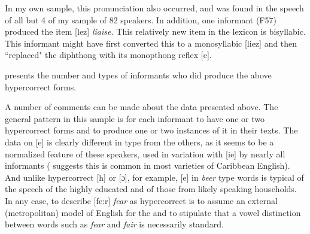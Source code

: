 In my own sample, this pronunciation also occurred, and was found in the speech of all but 4 of my sample of 82 speakers.  In addition, one informant (F57) produced the item [lez] \textit{liaise.}  This relatively new item in the  lexicon is bisyllabic.  This informant might have first converted this to a monosyllabic [liez] and then ``replaced" the diphthong with its monopthong reflex [e]. 

 presents the number and types of informants who did produce the above hypercorrect forms.  

\begin{table}
\caption{Qualitative hypercorrection in the JAMPRO sample\label{tab:3.54}}
\end{table}

A number of comments can be made about the data presented above.  The general pattern in this sample is for each informant to have one or two hypercorrect forms and to produce one or two instances of it in their texts.  The data on [e] is clearly different in type from the others, as it seems to be a normalized feature of these  speakers, used in variation with [ie] by nearly all informants (\citealt[xlvi]{Allsopp1996} suggests this is common in most varieties of Caribbean English).  And unlike hypercorrect [h] or [ɔ], for example, [e] in \textit{beer} type words is typical of the speech of the highly educated and of those from likely  speaking households.  In any case, to describe [fe:r] \textit{fear} as hypercorrect is to assume an external (metropolitan) model of English for the  and to stipulate that a vowel distinction between words such as \textit{fear} and \textit{fair} is necessarily standard.  

